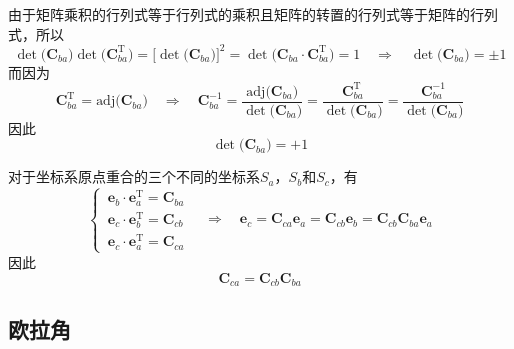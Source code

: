 \vspace*{0.5em}
\sssection[坐标变换矩阵的行列式为1]

由于矩阵乘积的行列式等于行列式的乘积且矩阵的转置的行列式等于矩阵的行列式，所以
\begin{equation}
	\det \big(\bm{C}_{ba}\big) \det \big(\bm{C}_{ba}^{\text{T}}\big) 
	= \big[ \det \big(\bm{C}_{ba} \big) \big]^2 
	= \det \big( \bm{C}_{ba} \cdot \bm{C}_{ba}^{\text{T}} \big) 
	= 1
	\quad \Rightarrow \quad 
	\det \big(\bm{C}_{ba}\big) = \pm 1
\end{equation}
而因为
\begin{equation*}
	\bm{C}_{ba}^{\text{T}} = \text{adj}\big( \bm{C}_{ba} \big) 
	\quad  \Rightarrow \quad 
	\bm{C}_{ba}^{-1} 
	= \dfrac{\text{adj}\big( \bm{C}_{ba} \big)}{\det \big( \bm{C}_{ba} \big)} 
	= \dfrac{\bm{C}_{ba}^{\text{T}}}{\det \big( \bm{C}_{ba} \big)} 
	= \dfrac{\bm{C}_{ba}^{-1}}{\det \big( \bm{C}_{ba} \big)}
\end{equation*}
因此
\begin{equation}
	\det \big( \bm{C}_{ba} \big) = + 1
\end{equation}

\clearpage


\sssection[相继运动的坐标变换矩阵]

对于坐标系原点重合的三个不同的坐标系$S_a$，$S_b$和$S_c$，有
\begin{equation*}
	\begin{cases}
		\, \bm{e}_b \cdot \bm{e}_a^{\text{T}} = \bm{C}_{ba} \\
		\, \bm{e}_c \cdot \bm{e}_b^{\text{T}} = \bm{C}_{cb} \\
		\, \bm{e}_c \cdot \bm{e}_a^{\text{T}} = \bm{C}_{ca}
	\end{cases}
	\quad \Rightarrow \quad 
	\bm{e}_c = \bm{C}_{ca} \bm{e}_a = \bm{C}_{cb}\bm{e}_b = \bm{C}_{cb} \bm{C}_{ba} \bm{e}_{a}
\end{equation*}
因此
\begin{equation}
	\bm{C}_{ca} = \bm{C}_{cb} \bm{C}_{ba}
\end{equation}
\vspace*{0.5em}


\subsection{欧拉角}
\vspace*{-1em}

